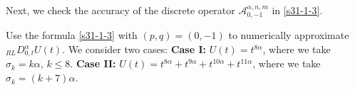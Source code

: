 \documentclass[10pt]{siamltex}
\begin{document}
Next, we check the accuracy of the discrete operator $\mathcal{{A}}_{0,-1}^{\alpha,n,m}$ in \eqref{s31-1-3}.
\begin{example}\label{eg3-2}
Use the formula \eqref{s31-1-3}  with $(p,q)=(0,-1)$
to numerically approximate ${}_{RL}D_{0,t}^{\alpha}U(t)$.  We consider two cases: \textbf{Case I:} $U(t)=t^{8\alpha}$, where we take $\sigma_k=k\alpha$, $k\le 8$. \textbf{Case II:} $U(t)=t^{8\alpha}+t^{9\alpha}+t^{10\alpha}+t^{11\alpha}$, where we take $\sigma_k=(k+7)\alpha$.
\end{example}

\end{document}
